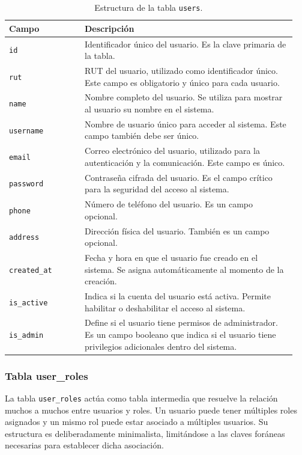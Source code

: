 \begin{table}[H]
  \centering
  \begin{tabular}{|p{0.25\linewidth}|p{0.7\linewidth}|}
    \hline
    \textbf{Campo} & \textbf{Descripción} \\
    \hline
    \texttt{id} & Identificador único del usuario. Es la clave primaria de la tabla. \\
    \hline
    \texttt{rut} & RUT del usuario, utilizado como identificador único. Este campo es obligatorio y único para cada usuario. \\
    \hline
    \texttt{name} & Nombre completo del usuario. Se utiliza para mostrar al usuario su nombre en el sistema. \\
    \hline
    \texttt{username} & Nombre de usuario único para acceder al sistema. Este campo también debe ser único. \\
    \hline
    \texttt{email} & Correo electrónico del usuario, utilizado para la autenticación y la comunicación. Este campo es único. \\
    \hline
    \texttt{password} & Contraseña cifrada del usuario. Es el campo crítico para la seguridad del acceso al sistema. \\
    \hline
    \texttt{phone} & Número de teléfono del usuario. Es un campo opcional. \\
    \hline
    \texttt{address} & Dirección física del usuario. También es un campo opcional. \\
    \hline
    \texttt{created\_at} & Fecha y hora en que el usuario fue creado en el sistema. Se asigna automáticamente al momento de la creación. \\
    \hline
    \texttt{is\_active} & Indica si la cuenta del usuario está activa. Permite habilitar o deshabilitar el acceso al sistema. \\
    \hline
    \texttt{is\_admin} & Define si el usuario tiene permisos de administrador. Es un campo booleano que indica si el usuario tiene privilegios adicionales dentro del sistema. \\
    \hline
  \end{tabular}
  \caption{Estructura de la tabla \texttt{users}.}
  \label{tab:tabla_users}
\end{table}

\subsubsection*{Tabla user\_roles}

La tabla \texttt{user\_roles} actúa como tabla intermedia que resuelve la relación 
muchos a muchos entre usuarios y roles. Un usuario puede tener múltiples roles 
asignados y un mismo rol puede estar asociado a múltiples usuarios. Su estructura 
es deliberadamente minimalista, limitándose a las claves foráneas necesarias para 
establecer dicha asociación.

